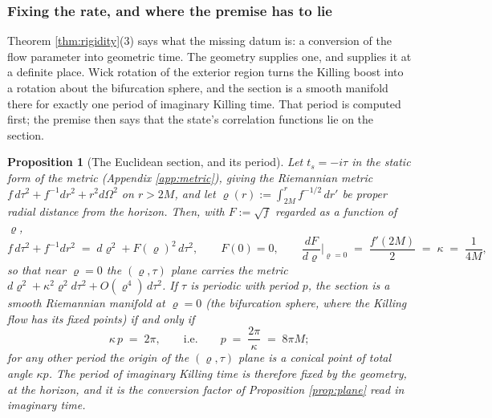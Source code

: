 \documentclass[11pt]{article}
\newtheorem{proposition}[theorem]{Proposition}
\theoremstyle{definition}
\begin{document}
\subsubsection*{Fixing the rate, and where the premise has to lie}

Theorem \ref{thm:rigidity}(3) says what the missing datum is: a conversion of the flow parameter into geometric time. The geometry supplies one, and supplies it at a definite place. Wick rotation of the exterior region turns the Killing boost into a rotation about the bifurcation sphere, and the section is a smooth manifold there for exactly one period of imaginary Killing time. That period is computed first; the premise then says that the state's correlation functions lie on the section.

\begin{proposition}[The Euclidean section, and its period]\label{prop:section}
Let $t_s = -i\tau$ in the static form of the metric (Appendix \ref{app:metric}), giving the Riemannian metric $f\,d\tau^{2} + f^{-1}dr^{2} + r^{2}d\Omega^{2}$ on $r > 2M$, and let $\varrho(r) := \int_{2M}^{r} f^{-1/2}\,dr'$ be proper radial distance from the horizon. Then, with $F := \sqrt f$ regarded as a function of $\varrho$,
\[
f\,d\tau^{2} + f^{-1}dr^{2} \;=\; d\varrho^{2} + F(\varrho)^{2}\,d\tau^{2}, \qquad F(0) = 0, \qquad \frac{dF}{d\varrho}\Big|_{\varrho = 0} \;=\; \frac{f'(2M)}{2} \;=\; \kappa \;=\; \frac{1}{4M} ,
\]
so that near $\varrho = 0$ the $(\varrho, \tau)$ plane carries the metric $d\varrho^{2} + \kappa^{2}\varrho^{2}d\tau^{2} + O(\varrho^{4})\,d\tau^{2}$. If $\tau$ is periodic with period $p$, the section is a smooth Riemannian manifold at $\varrho = 0$ (the bifurcation sphere, where the Killing flow has its fixed points) if and only if
\[
\kappa\,p \;=\; 2\pi, \qquad \text{i.e.} \qquad p \;=\; \frac{2\pi}{\kappa} \;=\; 8\pi M ;
\]
for any other period the origin of the $(\varrho, \tau)$ plane is a conical point of total angle $\kappa p$. The period of imaginary Killing time is therefore fixed by the geometry, at the horizon, and it is the conversion factor of Proposition \ref{prop:plane} read in imaginary time.
\end{proposition}
\end{document}
